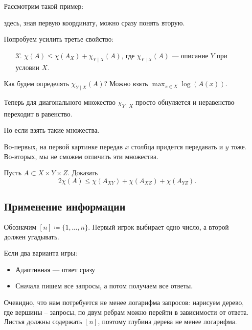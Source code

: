 Рассмотрим такой пример: 
\begin{figure}[ht]
    \centering
    \label{fig:diag-img}
\end{figure}
здесь, зная первую координату, можно сразу понять вторую.

Попробуем усилить третье свойство:
\begin{enumerate}
	\item[3'.] $ \chi(A) \le \chi(A_{X}) + \chi_{Y \mid X} (A)$, где $ \chi _{Y \mid X}(A)$ --- описание $ Y$ при условии $ X$.
\end{enumerate} 
Как будем определять $ \chi_{Y \mid X} (A)$?
Можно взять $ \max_{x \in X} \log(A(x))$.

Теперь для диагонального множество $ \chi_{Y \mid X}$ просто обнуляется и неравенство переходит в равенство.

Но если взять такие множества. 
\begin{figure}[ht]
    \centering
    \label{fig:corner-img}
\end{figure}
Во-первых, на первой картинке передав $ x$ столбца придется передавать  и $ y$ тоже. Во-вторых, мы не сможем отличить эти множества.
\begin{prac}
	Пусть $ A \subset X \times Y \times Z$.
	Доказать
	\[
		2 \chi(A) \le \chi(A_{XY}) + \chi(A_{XZ}) + \chi(A_{YZ})
	.\] 
\end{prac}

\subsection{Применение информации}
Обозначим $ [n] \coloneqq \{1, \ldots , n\}$.
Первый игрок выбирает одно число, а второй должен угадывать.

Если два варианта игры:
\begin{itemize}
	\item Адаптивная --- ответ сразу
	\item Сначала пишем все запросы, а потом получаем все ответы.
\end{itemize}
Очевидно, что нам потребуется не менее логарифма запросов: нарисуем дерево, где вершины -- запросы, по двум ребрам можно перейти в зависимости от ответа. Листья должны содержать $ [n]$, поэтому глубина дерева не менее логарифма.
\begin{figure}[ht]
    \centering
    \label{fig:graph-img}
\end{figure}

